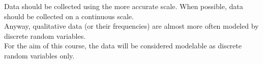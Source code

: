 \begin{frame}
  \vspace*{.75cm}
  Data should be collected using the more accurate scale. When possible, data should be collected on a continuous scale. \\
  \vspace*{1cm}
  Anyway, qualitative data (or their frequencies) are almost more often modeled by discrete random variables.\\
  \vspace*{1cm}
  For the aim of this course, the data will be considered modelable as discrete random variables only. 
\end{frame}





